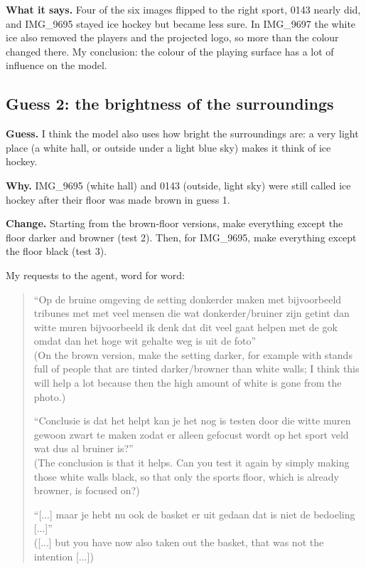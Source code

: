 \documentclass[11pt]{article}
\begin{document}
\textbf{What it says.} Four of the six images flipped to the right sport, 0143
nearly did, and IMG\_9695 stayed ice hockey but became less sure. In IMG\_9697 the
white ice also removed the players and the projected logo, so more than the colour
changed there. My conclusion: the colour of the playing surface has a lot of
influence on the model.

\subsection*{Guess 2: the brightness of the surroundings}

\textbf{Guess.} I think the model also uses how bright the surroundings are: a
very light place (a white hall, or outside under a light blue sky) makes it think
of ice hockey.

\textbf{Why.} IMG\_9695 (white hall) and 0143 (outside, light sky) were still
called ice hockey after their floor was made brown in guess 1.

\textbf{Change.} Starting from the brown-floor versions, make everything except
the floor darker and browner (test 2). Then, for IMG\_9695, make everything except
the floor black (test 3).

My requests to the agent, word for word:
\begin{quote}
``Op de bruine omgeving de setting donkerder maken met bijvoorbeeld tribunes met
met veel mensen die wat donkerder/bruiner zijn getint dan witte muren bijvoorbeeld
ik denk dat dit veel gaat helpen met de gok omdat dan het hoge wit gehalte weg is
uit de foto''\\
(On the brown version, make the setting darker, for example with stands full of
people that are tinted darker/browner than white walls; I think this will help a
lot because then the high amount of white is gone from the photo.)

``Conclusie is dat het helpt kan je het nog is testen door die witte muren gewoon
zwart te maken zodat er alleen gefocust wordt op het sport veld wat dus al bruiner
is?''\\
(The conclusion is that it helps. Can you test it again by simply making those
white walls black, so that only the sports floor, which is already browner, is
focused on?)

``[...] maar je hebt nu ook de basket er uit gedaan dat is niet de bedoeling
[...]''\\
([...] but you have now also taken out the basket, that was not the intention
[...])
\end{quote}
\end{document}
